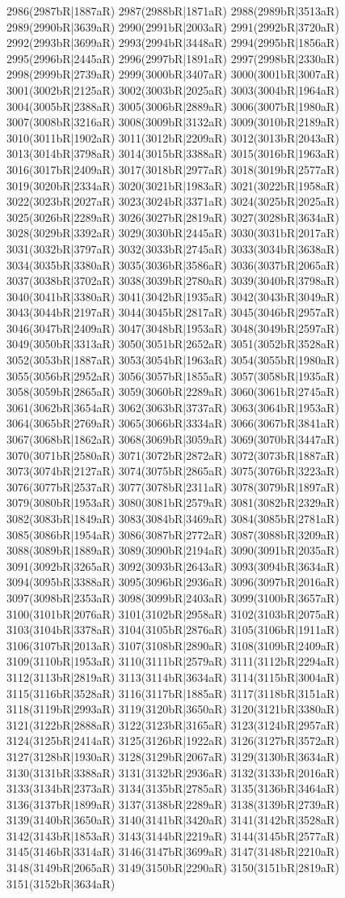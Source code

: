 2986(2987bR|1887aR) 2987(2988bR|1871aR) 2988(2989bR|3513aR) 2989(2990bR|3639aR) 2990(2991bR|2003aR) 2991(2992bR|3720aR) 2992(2993bR|3699aR) 2993(2994bR|3448aR) 2994(2995bR|1856aR) 2995(2996bR|2445aR) 2996(2997bR|1891aR) 2997(2998bR|2330aR) 2998(2999bR|2739aR) 2999(3000bR|3407aR) 3000(3001bR|3007aR) 3001(3002bR|2125aR) 3002(3003bR|2025aR) 3003(3004bR|1964aR) 3004(3005bR|2388aR) 3005(3006bR|2889aR) 3006(3007bR|1980aR) 3007(3008bR|3216aR) 3008(3009bR|3132aR) 3009(3010bR|2189aR) 3010(3011bR|1902aR) 3011(3012bR|2209aR) 3012(3013bR|2043aR) 3013(3014bR|3798aR) 3014(3015bR|3388aR) 3015(3016bR|1963aR) 3016(3017bR|2409aR) 3017(3018bR|2977aR) 3018(3019bR|2577aR) 3019(3020bR|2334aR) 3020(3021bR|1983aR) 3021(3022bR|1958aR) 3022(3023bR|2027aR) 3023(3024bR|3371aR) 3024(3025bR|2025aR) 3025(3026bR|2289aR) 3026(3027bR|2819aR) 3027(3028bR|3634aR) 3028(3029bR|3392aR) 3029(3030bR|2445aR) 3030(3031bR|2017aR) 3031(3032bR|3797aR) 3032(3033bR|2745aR) 3033(3034bR|3638aR) 3034(3035bR|3380aR) 3035(3036bR|3586aR) 3036(3037bR|2065aR) 3037(3038bR|3702aR) 3038(3039bR|2780aR) 3039(3040bR|3798aR) 3040(3041bR|3380aR) 3041(3042bR|1935aR) 3042(3043bR|3049aR) 3043(3044bR|2197aR) 3044(3045bR|2817aR) 3045(3046bR|2957aR) 3046(3047bR|2409aR) 3047(3048bR|1953aR) 3048(3049bR|2597aR) 3049(3050bR|3313aR) 3050(3051bR|2652aR) 3051(3052bR|3528aR) 3052(3053bR|1887aR) 3053(3054bR|1963aR) 3054(3055bR|1980aR) 3055(3056bR|2952aR) 3056(3057bR|1855aR) 3057(3058bR|1935aR) 3058(3059bR|2865aR) 3059(3060bR|2289aR) 3060(3061bR|2745aR) 3061(3062bR|3654aR) 3062(3063bR|3737aR) 3063(3064bR|1953aR) 3064(3065bR|2769aR) 3065(3066bR|3334aR) 3066(3067bR|3841aR) 3067(3068bR|1862aR) 3068(3069bR|3059aR) 3069(3070bR|3447aR) 3070(3071bR|2580aR) 3071(3072bR|2872aR) 3072(3073bR|1887aR) 3073(3074bR|2127aR) 3074(3075bR|2865aR) 3075(3076bR|3223aR) 3076(3077bR|2537aR) 3077(3078bR|2311aR) 3078(3079bR|1897aR) 3079(3080bR|1953aR) 3080(3081bR|2579aR) 3081(3082bR|2329aR) 3082(3083bR|1849aR) 3083(3084bR|3469aR) 3084(3085bR|2781aR) 3085(3086bR|1954aR) 3086(3087bR|2772aR) 3087(3088bR|3209aR) 3088(3089bR|1889aR) 3089(3090bR|2194aR) 3090(3091bR|2035aR) 3091(3092bR|3265aR) 3092(3093bR|2643aR) 3093(3094bR|3634aR) 3094(3095bR|3388aR) 3095(3096bR|2936aR) 3096(3097bR|2016aR) 3097(3098bR|2353aR) 3098(3099bR|2403aR) 3099(3100bR|3657aR) 3100(3101bR|2076aR) 3101(3102bR|2958aR) 3102(3103bR|2075aR) 3103(3104bR|3378aR) 3104(3105bR|2876aR) 3105(3106bR|1911aR) 3106(3107bR|2013aR) 3107(3108bR|2890aR) 3108(3109bR|2409aR) 3109(3110bR|1953aR) 3110(3111bR|2579aR) 3111(3112bR|2294aR) 3112(3113bR|2819aR) 3113(3114bR|3634aR) 3114(3115bR|3004aR) 3115(3116bR|3528aR) 3116(3117bR|1885aR) 3117(3118bR|3151aR) 3118(3119bR|2993aR) 3119(3120bR|3650aR) 3120(3121bR|3380aR) 3121(3122bR|2888aR) 3122(3123bR|3165aR) 3123(3124bR|2957aR) 3124(3125bR|2414aR) 3125(3126bR|1922aR) 3126(3127bR|3572aR) 3127(3128bR|1930aR) 3128(3129bR|2067aR) 3129(3130bR|3634aR) 3130(3131bR|3388aR) 3131(3132bR|2936aR) 3132(3133bR|2016aR) 3133(3134bR|2373aR) 3134(3135bR|2785aR) 3135(3136bR|3464aR) 3136(3137bR|1899aR) 3137(3138bR|2289aR) 3138(3139bR|2739aR) 3139(3140bR|3650aR) 3140(3141bR|3420aR) 3141(3142bR|3528aR) 3142(3143bR|1853aR) 3143(3144bR|2219aR) 3144(3145bR|2577aR) 3145(3146bR|3314aR) 3146(3147bR|3699aR) 3147(3148bR|2210aR) 3148(3149bR|2065aR) 3149(3150bR|2290aR) 3150(3151bR|2819aR) 3151(3152bR|3634aR) 